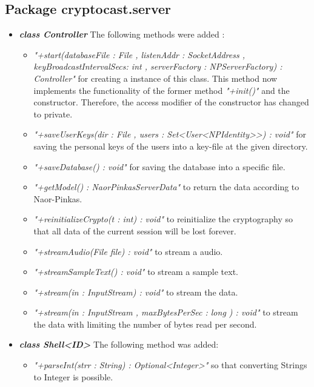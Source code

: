 \documentclass[a4paper,10pt]{scrartcl}
\begin{document}
\subsection{Package cryptocast.server}

\begin{itemize}
  
	\item \textbf{\textit{class Controller}} \newline
	The following methods were added :
	\begin{itemize}
	 \item \textit{"+start(databaseFile : File , listenAddr : SocketAddress , keyBroadcastIntervalSecs: int ,
	 serverFactory : NPServerFactory) : Controller"} for creating a instance of this class. This method now 
	 implements the functionality of the former method \textit{"+init()"} and the constructor. Therefore,
	the access modifier of the constructor has changed to private.
	 \item \textit{"+saveUserKeys(dir : File , users : Set<User<NPIdentity>>) : void"} for saving
	 the personal keys of the users into a key-file at the given directory.
	 \item \textit{"+saveDatabase() : void"} for saving the database into a specific file.
	 \item \textit{"+getModel() : NaorPinkasServerData"} to return the data according to Naor-Pinkas.
	 \item \textit{"+reinitializeCrypto(t : int) : void"} to reinitialize the cryptography so that 
	 all data of the current session will be lost forever.
	 \item \textit{"+streamAudio(File file) : void"} to stream a audio.
	 \item \textit{"+streamSampleText() : void"} to stream a sample text.
	 \item \textit{"+stream(in : InputStream) : void"} to stream the data.
	 \item \textit{"+stream(in : InputStream , maxBytesPerSec : long ) : void"} to stream the data with limiting 
	 the number of bytes read per second.
	\end{itemize}
	
	\item \textbf{\textit{class Shell<ID>}}\newline
	The following method was added:
\begin{itemize}
	 \item \textit{"+parseInt(strr : String) : Optional<Integer>"} so that converting Strings to Integer is possible.
\end{itemize}
	

\end{itemize}
\end{document}
